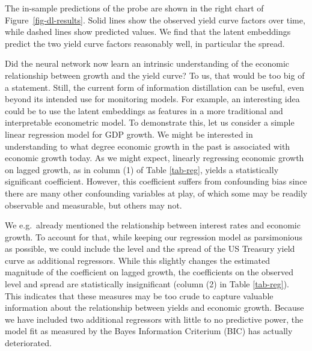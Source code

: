 The in-sample predictions of the probe are shown in the right chart of Figure~\ref{fig-dl-results}. Solid lines show the observed yield curve factors over time, while dashed lines show predicted values. We find that the latent embeddings predict the two yield curve factors reasonably well, in particular the spread. %

Did the neural network now learn an intrinsic understanding of the economic relationship between growth and the yield curve? To us, that would be too big of a statement. Still, the current form of information distillation can be useful, even beyond its intended use for monitoring models.
For example, an interesting idea could be to use the latent embeddings as features in a more traditional and interpretable econometric model. To demonstrate this, let us consider a simple linear regression model for GDP growth. We might be interested in understanding to what degree economic growth in the past is associated with economic growth today. As we might expect, linearly regressing economic growth on lagged growth, as in column (1) of Table \ref{tab-reg}, yields a statistically significant coefficient. However, this coefficient suffers from confounding bias since there are many other confounding variables at play, of which some may be readily observable and measurable, but others may not.


We e.g.\ already mentioned the relationship between interest rates and economic growth. To account for that, while keeping our regression model as parsimonious as possible, we could include the level and the spread of the US Treasury yield curve as additional regressors. While this slightly changes the estimated magnitude of the coefficient on lagged growth, the coefficients on the observed level and spread are statistically insignificant (column (2) in Table \ref{tab-reg}). This indicates that these measures may be too crude to capture valuable information about the relationship between yields and economic growth. Because we have included two additional regressors with little to no predictive power, the model fit as measured by the Bayes Information Criterium (BIC) has actually deteriorated.

